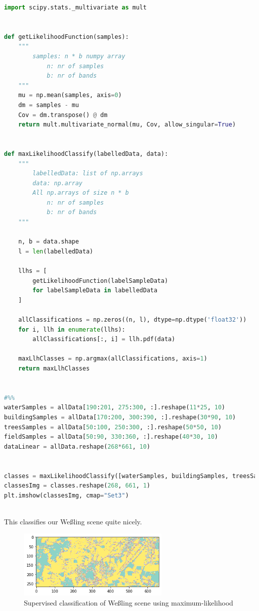 \begin{lstlisting}[language=python]
import scipy.stats._multivariate as mult


def getLikelihoodFunction(samples):
    """
        samples: n * b numpy array
            n: nr of samples
            b: nr of bands
    """
    mu = np.mean(samples, axis=0)
    dm = samples - mu
    Cov = dm.transpose() @ dm
    return mult.multivariate_normal(mu, Cov, allow_singular=True)


def maxLikelihoodClassify(labelledData, data):
    """
        labelledData: list of np.arrays
        data: np.array
        All np.arrays of size n * b
            n: nr of samples
            b: nr of bands
    """

    n, b = data.shape
    l = len(labelledData)

    llhs = [
        getLikelihoodFunction(labelSampleData)
        for labelSampleData in labelledData
    ]

    allClassifications = np.zeros((n, l), dtype=np.dtype('float32'))
    for i, llh in enumerate(llhs):
        allClassifications[:, i] = llh.pdf(data)

    maxLlhClasses = np.argmax(allClassifications, axis=1)
    return maxLlhClasses


#%%
waterSamples = allData[190:201, 275:300, :].reshape(11*25, 10)
buildingSamples = allData[170:200, 300:390, :].reshape(30*90, 10)
treesSamples = allData[50:100, 250:300, :].reshape(50*50, 10)
fieldSamples = allData[50:90, 330:360, :].reshape(40*30, 10)
dataLinear = allData.reshape(268*661, 10)


classes = maxLikelihoodClassify([waterSamples, buildingSamples, treesSamples, fieldSamples], dataLinear)
classesImg = classes.reshape(268, 661, 1)
plt.imshow(classesImg, cmap="Set3")
    
\end{lstlisting}


This classifies our Weßling scene quite nicely.
\begin{figure}[H]
    \caption{Supervised classification of Weßling scene using maximum-likelihood}
    \centering
      \includegraphics[width=0.65\textwidth]{images/max_likelihood_wessling.png}
\end{figure}





